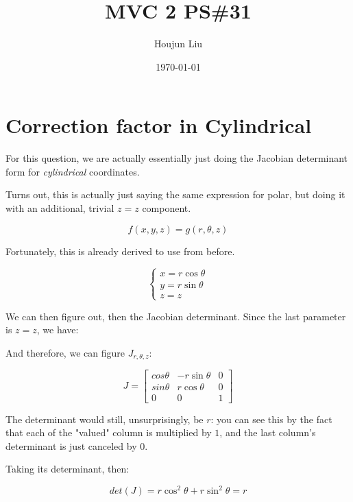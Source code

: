 \documentclass[letterpaper]{article}
\author{Houjun Liu}
\date{\today}
\title{MVC 2 PS\#31}
\renewcommand{\tableofcontents}{}
\renewcommand\maketitle{}
\begin{document}
\maketitle
\tableofcontents


\section{Correction factor in Cylindrical}
\label{sec:org65230d6}
For this question, we are actually essentially just doing the Jacobian determinant form for \emph{cylindrical} coordinates.

Turns out, this is actually just saying the same expression for polar, but doing it with an additional, trivial \(z=z\) component.

\begin{equation}
   f(x,y,z) = g(r, \theta,z) 
\end{equation}

Fortunately, this is already derived to use from before.

\begin{equation}
   \begin{cases}
   x = r\cos\theta \\
   y = r\sin\theta \\
   z = z
\end{cases}
\end{equation}

We can then figure out, then the Jacobian determinant. Since the last parameter is \(z=z\), we have:

And therefore, we can figure \(J_{r,\theta,z}\):

\begin{equation}
   J = \begin{bmatrix} 
cos\theta & -r\sin\theta & 0\\
sin\theta & r\cos\theta & 0\\
0 & 0 & 1
\end{bmatrix} 
\end{equation}

The determinant would still, unsurprisingly, be \(r\): you can see this by the fact that each of the "valued" column is multiplied by \(1\), and the last column's determinant is just canceled by \(0\).

Taking its determinant, then:

\begin{equation}
   det(J) = r\cos^2\theta +r\sin^2\theta = r
\end{equation}
\end{document}

